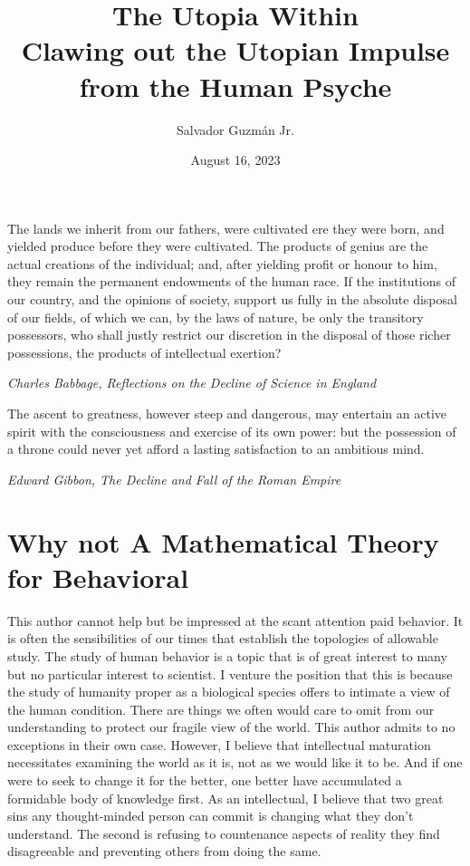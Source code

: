 \documentclass[12pt]{article}
\title{
The Utopia Within \\
\large Clawing out the Utopian Impulse from the Human Psyche}
\author{Salvador Guzm\'an Jr.}
\date{August 16, 2023}
\begin{document}
\maketitle
\pagebreak

\begin{abstract}
    
\end{abstract}

\pagebreak

\begin{center}
    \epigraph{
        The lands we inherit from our fathers, were cultivated ere they were born, and yielded produce before they were cultivated. The products of genius are the actual creations of the individual; and, after yielding profit or honour to him, they remain the permanent endowments of the human race. If the institutions of our country, and the opinions of society, support us fully in the absolute disposal of our fields, of which we can, by the laws of nature, be only the transitory possessors, who shall justly restrict our discretion in the disposal of those richer possessions, the products of intellectual exertion?    }{\textit{Charles Babbage, Reflections on the Decline of Science in England}}
    \epigraph{
        The ascent to greatness, however steep and dangerous, may entertain an active spirit with the consciousness and exercise of its own power: but the possession of a throne could never yet afford a lasting satisfaction to an ambitious mind.
    }{\textit{Edward Gibbon, The Decline and Fall of the Roman Empire}}
\end{center}

\pagebreak

\tableofcontents

\pagebreak

\section{Why not A Mathematical Theory for Behavioral}
This author cannot help but be impressed at the scant attention paid behavior.
It is often the sensibilities of our times that establish the topologies of allowable study.
The study of human behavior is a topic that is of great interest to many but no particular interest to scientist.
I venture the position that this is because the study of humanity proper as a biological species offers to intimate a view of the human condition.
There are things we often would care to omit from our understanding to protect our fragile view of the world.
This author admits to no exceptions in their own case.
However, I believe that intellectual maturation necessitates examining the world as it is, not as we would like it to be.
And if one were to seek to change it for the better, one better have accumulated a formidable body of knowledge first.
As an intellectual, I believe that two great sins any thought-minded person can commit is changing what they don't understand.
The second is refusing to countenance aspects of reality they find disagreeable and preventing others from doing the same.
\end{document}
